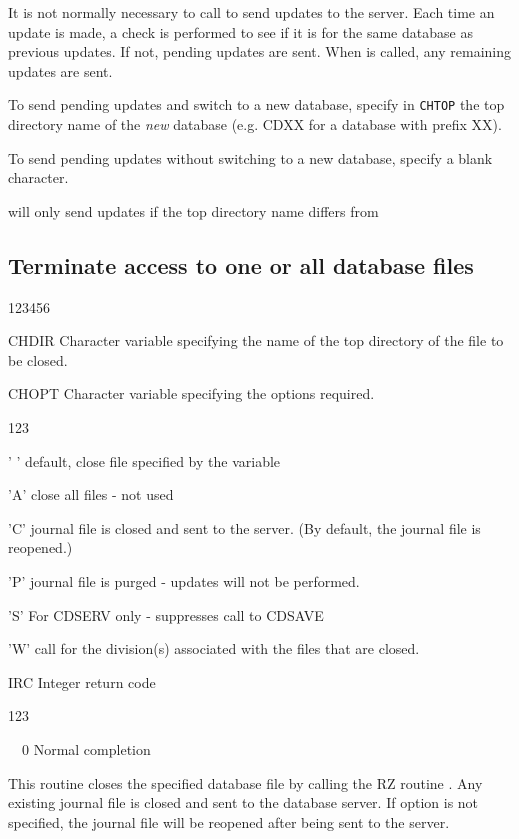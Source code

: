 It is not normally necessary to call  to send updates
to the server. Each time an update is made, a check is performed to
see if it is for the same database as previous updates. If not, pending
updates are sent. When  is called, any remaining
updates are sent.

To send pending updates and switch to a new database, specify
in {\tt CHTOP} the top directory name of the {\it new} database
(e.g. CDXX for a database with prefix XX).

To send pending updates without switching to a new database,
specify a blank character.


 will only send updates if the top directory name
differs from 
\subsection{Terminate access to one or all database files}


\begin{DLtt}{123456}
\item[CHDIR]Character variable specifying the name of the top directory of the
file to be closed.
\item[CHOPT]Character variable specifying the options required.
  \begin{DLtt}{123}
    \item[' ']default, close file specified by the variable 
    \item['A']close all files -  not used
    \item['C']journal file is closed and sent to the server. (By default,
              the journal file is reopened.)
    \item['P']journal file is purged - updates will not be performed.
    \item['S']For CDSERV only - suppresses call to CDSAVE
    \item['W']call  for the division(s) associated with the files that are closed.
  \end{DLtt}
\item[IRC]Integer return code
  \begin{DLtt}{123}
    \item[\ \ 0]Normal completion
  \end{DLtt}
\end{DLtt}

This routine closes the specified database file by calling
the RZ routine .
Any existing journal file is closed and sent
to the database server. If option  is not specified, the journal
file will be reopened after being sent to the server.


